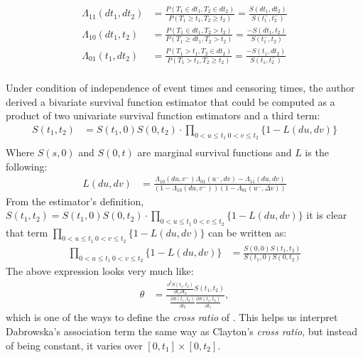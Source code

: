 \documentclass[]{article}
\begin{document}
	$$
	\begin{aligned}
		\Lambda_{11}(dt_1,dt_2) &= \frac{P(T_1 \in dt_1, T_2\in dt_2)}{P(T_1 \geq t_1, T_2 \geq t_2)} = \frac{S(dt_1, dt_2)}{S(t_1^-, t_2^-)}\\
		\Lambda_{10}(dt_1,t_2) &= \frac{P(T_1 \in dt_1, T_2 > t_2)}{P(T_1 \geq dt_1, T_2 > t_2)} = \frac{-S(dt_1, t_2)}{S(t_1^-, t_2)}\\ %
		\Lambda_{01}(t_1,dt_2) &= \frac{P(T_1 > t_1, T_2\in dt_2)}{P(T_1 > t_1, T_2 \geq t_2)} = \frac{-S(t_1, dt_2)}{S(t_1, t_2^-)}\\
	\end{aligned}
	$$


Under condition of independence of event times and censoring times, the author derived a bivariate survival function estimator that could be computed as a product of two univariate survival function estimators and a third term:
	$$
	\begin{aligned}
		{S}(t_1,t_2) &= {S}(t_1,0){S}(0,t_2)\cdot \prod_{{0<u\leq t_1~0<v\leq t_2}}\{1 - {L}(d u, d v)\}\\
	\end{aligned}
	$$
Where $S(s,0)$ and $S(0,t)$ are marginal survival functions and $L$ is the following:
	$$
	\begin{aligned}
		L(du, dv) &= \frac{{\Lambda}_{10}(d u,v^-){\Lambda}_{01}(u^-,d v) - {\Lambda}_{11}(du, dv)}{\left(1-{\Lambda}_{10}(d u,v^-)\right)\left(1-{\Lambda}_{01}(u^-,\Delta v)\right)}
	\end{aligned}
	$$
From the estimator's definition, ${S}(t_1,t_2) = {S}(t_1,0){S}(0,t_2)\cdot \prod_{{0<u\leq t_1~0<v\leq t_2}}\{1 - {L}(d u, d v)\}$ it is clear that term $\prod_{{0<u\leq t_1~0<v\leq t_2}}\{1 - {L}(d u, d v)\}$ can be written as:
	$$
	\begin{aligned}
		\prod_{{0<u\leq t_1~0<v\leq t_2}}\{1 - {L}(d u, d v)\} &=
		\frac{S(0,0)  S(t_1,t_2)}{ S(t_1,0)S(0,t_2) }
	\end{aligned}
	$$
The above expression looks very much like:
	$$
	\begin{aligned}
		\theta &= \frac{ \frac{\partial^2 S(t_1,t_2)}{\partial t_1 \partial t_2} S(t_1, t_2)}    {\frac{\partial S(t_1, t_2)}{\partial t_2} \frac{\partial S(t_1, t_2)}{\partial t_1}},
	\end{aligned}
	$$
which is one of the ways to define the \emph{cross ratio} of \cite{clayton1978model}. This helps us interpret Dabrowska's association term the same way as Clayton's \emph{cross ratio}, but instead of being constant, it varies over $[0, t_1]\times [0, t_2]$.\\
\end{document}
